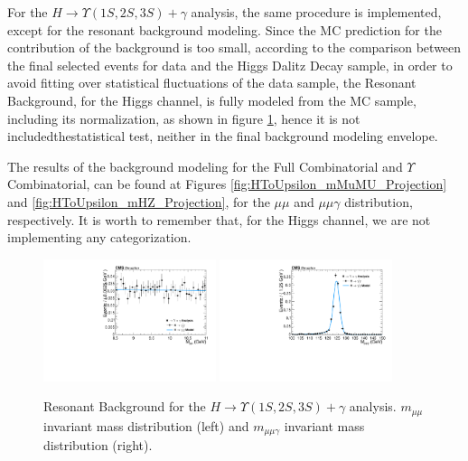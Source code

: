 For the $H \rightarrow \Upsilon(1S,2S,3S) + \gamma$ analysis, the same procedure is implemented, except for the resonant background modeling. Since the MC prediction for the contribution of the background is too small, according to the comparison between the final selected events for data and the Higgs Dalitz Decay sample, in order to avoid fitting over statistical fluctuations of the data sample, the Resonant Background, for the Higgs channel, is fully modeled from the MC sample, including its normalization, as shown in figure \ref{fig:HToUpsilon_PeakingBackground}, hence it is not includedthestatistical test, neither in the final background modeling envelope.

The results of the background modeling for the Full Combinatorial and $\Upsilon$ Combinatorial, can be found at Figures \ref{fig:HToUpsilon_mMuMU_Projection} and \ref{fig:HToUpsilon_mHZ_Projection}, for the $\mu\mu$ and $\mu\mu\gamma$ distribution, respectively. It is worth to remember that, for the Higgs channel, we are not implementing any categorization.


\begin{figure}[!htbp]
\begin{center}
\includegraphics[width=0.45\textwidth]{figures_and_tables/fitPlotFiles2D/HToUpsilonPhotonSignalAndBackgroundFit/mMuMNU_HToUpsilon1SPhotonSignalAndBackgroundFit_PeakingBackground_Cat0}\hspace*{1.cm}
\includegraphics[width=0.45\textwidth]{figures_and_tables/fitPlotFiles2D/HToUpsilonPhotonSignalAndBackgroundFit/mHZ_HToUpsilon1SPhotonSignalAndBackgroundFit_PeakingBackground_Cat0}\hspace*{1.cm}
\end{center}\vspace*{-.5cm}
\caption{Resonant Background for the $H \rightarrow \Upsilon(1S,2S,3S) +\gamma$ analysis. $m_{\mu\mu}$ invariant mass distribution (left) and $m_{\mu\mu\gamma}$ invariant mass distribution (right).}
\label{fig:HToUpsilon_PeakingBackground}
\end{figure}


